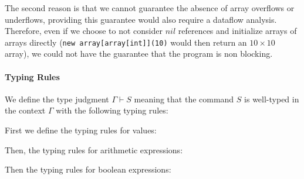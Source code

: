 \documentclass{article}
\begin{document}
The second reason is that we cannot guarantee the absence of  array overflows or underflows, providing this guarantee would also require a dataflow analysis.
Therefore, even if we choose to not consider \(nil\) references and initialize arrays of arrays directly (\texttt{new array[array[int]](10)} would then return an \(10 \times 10\) array), we could not have the guarantee that the program is non blocking.

\paragraph{Typing Rules}
We define the type judgment \(\Gamma \vdash S\) meaning that the command \(S\) is well-typed in the context \(\Gamma\) with the following typing rules:

First we define the typing rules for values:

Then, the typing rules for arithmetic expressions:

Then the typing rules for boolean expressions:

\end{document}
